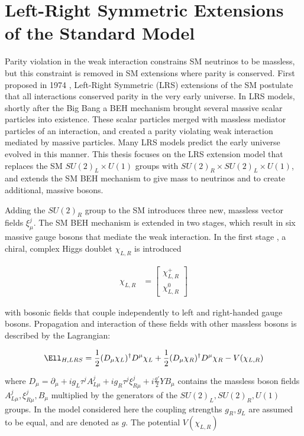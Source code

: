 \section{Left-Right Symmetric Extensions of the Standard Model}
Parity violation in the weak interaction constrains SM neutrinos to be massless, but this constraint is removed 
in SM extensions where parity is conserved.  First proposed in 1974 \cite{earlyLRSModel}, Left-Right Symmetric (LRS) 
extensions of the SM postulate that all interactions conserved parity in the very early universe.  In LRS models, shortly after 
the Big Bang a BEH mechanism brought several massive scalar particles into existence.  These scalar particles merged 
with massless mediator particles of an interaction, and created a parity violating weak interaction mediated by 
massive particles.  Many LRS models predict the early universe evolved in this manner.  This thesis focuses on the 
LRS extension model that replaces the SM $SU(2)_{L} \times U(1)$ groups with $SU(2)_{R} \times SU(2)_{L} \times U(1)$, 
and extends the SM BEH mechanism to give mass to neutrinos and to create additional, massive bosons.

Adding the $SU(2)_{R}$ group to the SM introduces three new, massless vector fields $\xi^{j}_{\mu}$.  The SM BEH mechanism 
is extended in two stages, which result in six massive gauge bosons that mediate the weak interaction.  In the first 
stage \cite{lrsHiggsStageOne}, a chiral, complex Higgs doublet $\chi_{L,R}$ is introduced 

\begin{align}
	\chi_{L,R} &= \begin{bmatrix}
	\chi^{+}_{L,R} \\
	\chi^{0}_{L,R}
	\end{bmatrix}
	\label{eq:stageOneVEV}
\end{align}

with bosonic fields that couple independently to left and right-handed gauge bosons.  Propagation and interaction of these 
fields with other massless bosons is described by the Lagrangian:

\begin{equation}
	\Ell_{H,LRS} = \frac{1}{2}(D_{\mu}\chi_{L})^{\dagger}D^{\mu}\chi_{L} + \frac{1}{2}(D_{\mu}\chi_{R})^{\dagger}D^{\mu}\chi_{R} - V(\chi_{L,R})
\end{equation}

where $D_{\mu} = \partial_{\mu} + ig_{L}\tau^{j}A^{j}_{L\mu} + ig_{R}\tau^{j}\xi^{j}_{R\mu} + i\frac{g'}{2}YB_{\mu}$ contains 
the massless boson fields $A^{j}_{L\mu}, \xi^{j}_{R\mu}, B_{\mu}$ multiplied by the generators of the $SU(2)_{L}, SU(2)_{R}, U(1)$ groups.  
In the model considered here the coupling strengths $g_{R}, g_{L}$ are assumed to be equal, and are denoted as $g$.  The potential $V(\chi_{L,R})$

